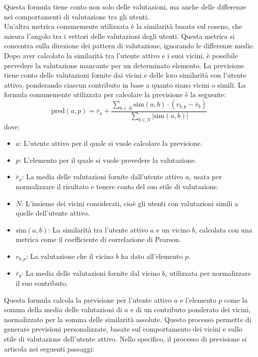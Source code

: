 \documentclass{report}
\begin{document}
	Questa formula tiene conto non solo delle valutazioni, ma anche delle differenze nei comportamenti di valutazione tra gli utenti.
	\vspace{\baselineskip}\\
	Un'altra metrica comunemente utilizzata è la similarità basata sul coseno, che misura l'angolo tra i vettori delle valutazioni degli utenti. Questa metrica si concentra sulla direzione dei pattern di valutazione, ignorando le differenze medie.
	\vspace{\baselineskip}\\
	Dopo aver calcolato la similarità tra l'utente attivo e i suoi vicini, è possibile prevedere la valutazione mancante per un determinato elemento. La previsione tiene conto delle valutazioni fornite dai vicini e delle loro similarità con l'utente attivo, ponderando ciascun contributo in base a quanto siano vicini o simili. La formula comunemente utilizzata per calcolare la previsione è la seguente:
	\[
	\text{pred}(a,p) = \bar{r}_a + \frac{\sum_{b \in N} \text{sim}(a, b) \cdot (r_{b,p} - \bar{r}_b)}{\sum_{b \in N} |\text{sim}(a, b)|}
	\]
	dove:
	\begin{itemize}
		\item \(a\): L'utente attivo per il quale si vuole calcolare la previsione.
		\item \(p\): L'elemento per il quale si vuole prevedere la valutazione.
		\item \(\bar{r}_a\): La media delle valutazioni fornite dall'utente attivo \(a\), usata per normalizzare il risultato e tenere conto del suo stile di valutazione.
		\item \(N\): L'insieme dei vicini considerati, cioè gli utenti con valutazioni simili a quelle dell'utente attivo.
		\item \(\text{sim}(a, b)\): La similarità tra l'utente attivo \(a\) e un vicino \(b\), calcolata con una metrica come il coefficiente di correlazione di Pearson.
		\item \(r_{b,p}\): La valutazione che il vicino \(b\) ha dato all'elemento \(p\).
		\item \(\bar{r}_b\): La media delle valutazioni fornite dal vicino \(b\), utilizzata per normalizzare il suo contributo.
	\end{itemize}
	Questa formula calcola la previsione per l'utente attivo \(a\) e l'elemento \(p\) come la somma della media delle valutazioni di \(a\) e di un contributo ponderato dei vicini, normalizzato per la somma delle similarità assolute. Questo processo permette di generare previsioni personalizzate, basate sul comportamento dei vicini e sullo stile di valutazione dell'utente attivo. Nello specifico, il processo di previsione si articola nei seguenti passaggi:
\end{document}
